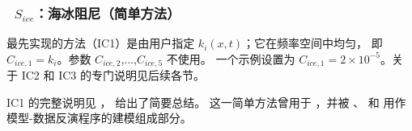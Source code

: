 \vsssub
\subsubsection{~$S_{ice}$：海冰阻尼（简单方法）} \label{sec:ICE1}
\vsssub


最先实现的方法（{\code IC1}）是由用户指定 ${k_i(x,t)}$；它在频率空间中均匀，
即 ${C_{ice,1}}={k_i}$。参数 ${C_{ice,2}}$,...,${C_{ice,5}}$ 不使用。
一个示例设置为 ${C_{ice,1}}=2\times 10^{-5}$。关于 {\code IC2} 和 {\code IC3}
的专门说明见后续各节。

{\code IC1} 的完整说明见 \cite{rep:RO13}，\cite{rep:RPLA18} 给出了简要总结。
这一简单方法曾用于 \cite{art:LKS15}，并被 \cite{art:RTS16}、\cite{rep:RPLA18}
和 \cite{rep:RMK18} 用作模型-数据反演程序的建模组成部分。
